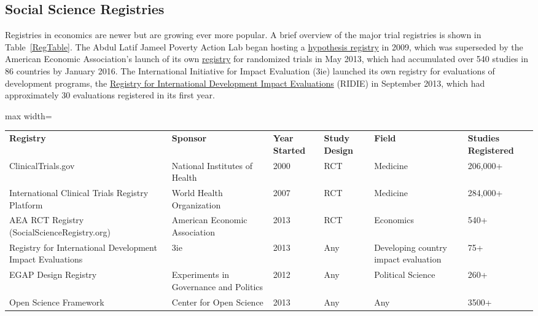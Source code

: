 \documentclass[12pt] {article}
\begin{document}
\subsection{Social Science Registries}\label{social-science-registries}

Registries in economics are newer but are growing ever more
popular. A brief overview of the major trial registries is shown in Table~\ref{RegTable}. The Abdul Latif Jameel Poverty Action Lab began hosting a
\href{http://www.povertyactionlab.org/hypothesis-registry}{hypothesis registry}
 in 2009, which was superseded by the American Economic Association's launch of its own \href{http://socialscienceregistry.org}{registry} for randomized trials in May 2013, which had accumulated over 540 studies in 86 countries by
January 2016. The International Initiative for Impact Evaluation (3ie)
launched its own registry for evaluations of development programs, the
\href{http://ridie.3ieimpact.org}{Registry for International Development Impact Evaluations} (RIDIE) in September 2013, which had
approximately 30 evaluations registered in its first year.



\begin{sidewaystable}[]
\centering
\caption{Registries in Medicine and the Social Sciences}
\label{RegTable}
\begin{adjustbox}{max width=\textwidth}
\begin{tabular}{llllll}
{\bf Registry} & {\bf Sponsor} & {\bf Year Started} & {\bf Study Design} & {\bf Field} & {\bf Studies Registered} \\
ClinicalTrials.gov & National Institutes of Health & 2000 & RCT & Medicine & 206,000+ \\
International Clinical Trials Registry Platform & World Health Organization & 2007 & RCT & Medicine & 284,000+ \\
AEA RCT Registry (SocialScienceRegistry.org) & American Economic Association & 2013 & RCT & Economics & 540+ \\
Registry for International Development Impact Evaluations & 3ie & 2013 & Any & Developing country impact evaluation & 75+ \\
EGAP Design Registry & Experiments in Governance and Politics & 2012 & Any & Political Science & 260+ \\
Open Science Framework & Center for Open Science & 2013 & Any & Any & 3500+
\end{tabular}
\end{adjustbox}
\end{sidewaystable}
\end{document}
